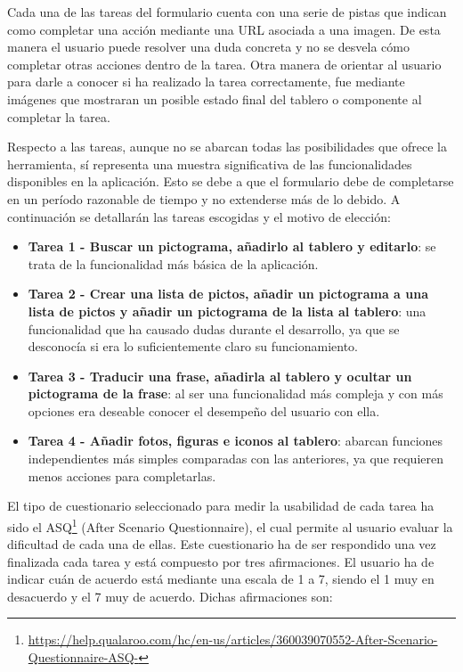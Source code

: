 Cada una de las tareas del formulario cuenta con una serie de pistas que indican como completar una acción mediante una URL asociada a una imagen. De esta manera el usuario puede resolver una duda concreta y no se desvela cómo completar otras acciones dentro de la tarea. Otra manera de orientar al usuario para darle a conocer si ha realizado la tarea correctamente, fue mediante imágenes que mostraran un posible estado final del tablero o componente al completar la tarea.


Respecto a las tareas, aunque no se abarcan todas las posibilidades que ofrece la herramienta, sí representa una muestra significativa de las funcionalidades disponibles en la aplicación. Esto se debe a que el formulario debe de completarse en un período razonable de tiempo y no extenderse más de lo debido. 
A continuación se detallarán las tareas escogidas y el motivo de elección: 

\begin{itemize}
	\item \textbf{Tarea 1 - Buscar un pictograma, añadirlo al tablero y editarlo}: se trata de la funcionalidad más básica de la aplicación.
	\item \textbf{Tarea 2 - Crear una lista de pictos, añadir un pictograma a una lista de pictos y añadir un pictograma de la lista al tablero}: una funcionalidad que ha causado dudas durante el desarrollo, ya que se desconocía si era lo suficientemente claro su funcionamiento.
	\item \textbf{Tarea 3 - Traducir una frase, añadirla al tablero y ocultar un pictograma de la frase}: al ser una funcionalidad más compleja y con más opciones era deseable conocer el desempeño del usuario con ella.
	\item \textbf{Tarea 4 - Añadir fotos, figuras e iconos al tablero}: abarcan funciones independientes más simples comparadas con las anteriores, ya que requieren menos acciones para completarlas.
\end{itemize}
El tipo de cuestionario seleccionado para medir la usabilidad de cada tarea ha sido el ASQ\footnote{\url{https://help.qualaroo.com/hc/en-us/articles/360039070552-After-Scenario-Questionnaire-ASQ-}} (After Scenario Questionnaire), el cual permite al usuario evaluar la dificultad de cada una de ellas. Este cuestionario ha de ser respondido una vez finalizada cada tarea y está compuesto por tres afirmaciones. El usuario ha de indicar cuán de acuerdo está mediante una escala de 1 a 7, siendo el 1 muy en desacuerdo y el 7 muy de acuerdo. Dichas afirmaciones son: 

